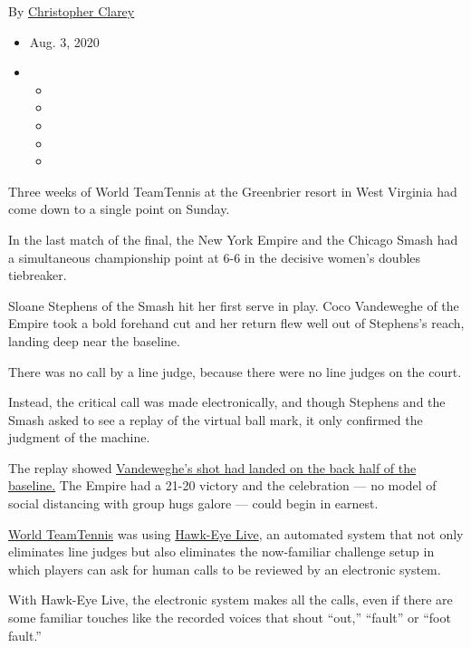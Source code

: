 By
\href{https://www.nytimes3xbfgragh.onion/by/christopher-clarey}{Christopher
Clarey}

\begin{itemize}
\item
  Aug. 3, 2020
\item
  \begin{itemize}
  \item
  \item
  \item
  \item
  \item
  \end{itemize}
\end{itemize}

Three weeks of World TeamTennis at the Greenbrier resort in West
Virginia had come down to a single point on Sunday.

In the last match of the final, the New York Empire and the Chicago
Smash had a simultaneous championship point at 6-6 in the decisive
women's doubles tiebreaker.

Sloane Stephens of the Smash hit her first serve in play. Coco
Vandeweghe of the Empire took a bold forehand cut and her return flew
well out of Stephens's reach, landing deep near the baseline.

There was no call by a line judge, because there were no line judges on
the court.

Instead, the critical call was made electronically, and though Stephens
and the Smash asked to see a replay of the virtual ball mark, it only
confirmed the judgment of the machine.

The replay showed
\href{https://twitter.com/WorldTeamTennis/status/1290004012100714497}{Vandeweghe's
shot had landed on the back half of the baseline.} The Empire had a
21-20 victory and the celebration --- no model of social distancing with
group hugs galore --- could begin in earnest.

\href{https://www.nytimes3xbfgragh.onion/2020/07/11/sports/tennis/Bryan-brothers.html}{World
TeamTennis} was using
\href{https://www.nytimes3xbfgragh.onion/2018/03/01/sports/tennis/hawkeye-live-line-calling.html?searchResultPosition=1}{Hawk-Eye
Live}, an automated system that not only eliminates line judges but also
eliminates the now-familiar challenge setup in which players can ask for
human calls to be reviewed by an electronic system.

With Hawk-Eye Live, the electronic system makes all the calls, even if
there are some familiar touches like the recorded voices that shout
``out,'' ``fault'' or ``foot fault.''

